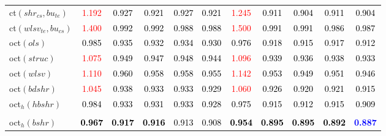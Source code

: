 \begin{tabular}[t]{l|>{}cccc>{}c|ccccc}
ct$(shr_{cs}, bu_{te})$ & \textcolor{red}{1.192} & \textcolor{black}{0.927} & \textcolor{black}{0.921} & \textcolor{black}{0.927} & \textcolor{black}{0.921} & \textcolor{red}{1.245} & \textcolor{black}{0.911} & \textcolor{black}{0.904} & \textcolor{black}{0.911} & \textcolor{black}{0.904}\\
ct$(wlsv_{te}, bu_{cs})$ & \textcolor{red}{1.400} & \textcolor{black}{0.992} & \textcolor{black}{0.992} & \textcolor{black}{0.988} & \textcolor{black}{0.988} & \textcolor{red}{1.500} & \textcolor{black}{0.991} & \textcolor{black}{0.991} & \textcolor{black}{0.986} & \textcolor{black}{0.987}\\
oct$(ols)$ & \textcolor{black}{0.985} & \textcolor{black}{0.935} & \textcolor{black}{0.932} & \textcolor{black}{0.934} & \textcolor{black}{0.930} & \textcolor{black}{0.976} & \textcolor{black}{0.918} & \textcolor{black}{0.915} & \textcolor{black}{0.917} & \textcolor{black}{0.912}\\
oct$(struc)$ & \textcolor{red}{1.075} & \textcolor{black}{0.949} & \textcolor{black}{0.947} & \textcolor{black}{0.948} & \textcolor{black}{0.944} & \textcolor{red}{1.096} & \textcolor{black}{0.939} & \textcolor{black}{0.936} & \textcolor{black}{0.938} & \textcolor{black}{0.933}\\
oct$(wlsv)$ & \textcolor{red}{1.110} & \textcolor{black}{0.960} & \textcolor{black}{0.958} & \textcolor{black}{0.958} & \textcolor{black}{0.955} & \textcolor{red}{1.142} & \textcolor{black}{0.953} & \textcolor{black}{0.949} & \textcolor{black}{0.951} & \textcolor{black}{0.946}\\
oct$(bdshr)$ & \textcolor{red}{1.045} & \textcolor{black}{0.938} & \textcolor{black}{0.933} & \textcolor{black}{0.933} & \textcolor{black}{0.929} & \textcolor{red}{1.060} & \textcolor{black}{0.926} & \textcolor{black}{0.920} & \textcolor{black}{0.921} & \textcolor{black}{0.915}\\
oct$_h(hbshr)$ & \textcolor{black}{0.984} & \textcolor{black}{0.933} & \textcolor{black}{0.931} & \textcolor{black}{0.933} & \textcolor{black}{0.928} & \textcolor{black}{0.975} & \textcolor{black}{0.915} & \textcolor{black}{0.912} & \textcolor{black}{0.915} & \textcolor{black}{0.909}\\[-1.5ex]
\hline\\[-1.5ex]
oct$_h(bshr)$ & \textcolor{black}{\textbf{0.967}} & \textcolor{black}{\textbf{0.917}} & \textcolor{black}{\textbf{0.916}} & \textcolor{black}{0.913} & \textcolor{black}{0.908} & \textcolor{black}{\textbf{0.954}} & \textcolor{black}{\textbf{0.895}} & \textcolor{black}{\textbf{0.895}} & \textcolor{black}{\textbf{0.892}} & \textcolor{blue}{\textbf{0.887}}\\

\end{tabular}
